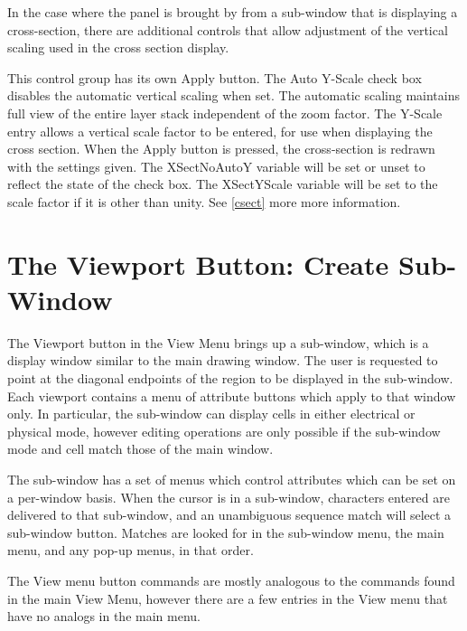 In the case where the panel is brought by from a sub-window that is
displaying a cross-section, there are additional controls that allow
adjustment of the vertical scaling used in the cross section display.

This control group has its own {\cb Apply} button.  The {\cb Auto
Y-Scale} check box disables the automatic vertical scaling when set. 
The automatic scaling maintains full view of the entire layer stack
independent of the zoom factor.  The {\cb Y-Scale} entry allows a
vertical scale factor to be entered, for use when displaying the cross
section.  When the {\cb Apply} button is pressed, the cross-section is
redrawn with the settings given.  The {\et XSectNoAutoY} variable will
be set or unset to reflect the state of the check box.  The {\et
XSectYScale} variable will be set to the scale factor if it is other
than unity.  See \ref{csect} more more information.


\section{The {\cb Viewport} Button: Create Sub-Window}
\label{subwin}
The {\cb Viewport} button in the {\cb View Menu} brings up a
sub-window, which is a display window similar to the main drawing
window.  The user is requested to point at the diagonal endpoints of
the region to be displayed in the sub-window.  Each viewport contains a
menu of attribute buttons which apply to that window only.  In
particular, the sub-window can display cells in either electrical or
physical mode, however editing operations are only possible if the
sub-window mode and cell match those of the main window.

The sub-window has a set of menus which control attributes which can be
set on a per-window basis.  When the cursor is in a sub-window,
characters entered are delivered to that sub-window, and an unambiguous
sequence match will select a sub-window button.  Matches are looked for
in the sub-window menu, the main menu, and any pop-up menus, in that
order.

The {\cb View} menu button commands are mostly analogous to the
commands found in the main {\cb View Menu}, however there are a few
entries in the {\cb View} menu that have no analogs in the main menu.

